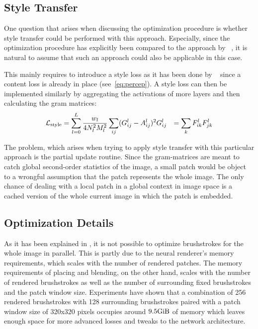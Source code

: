 \subsection{Style Transfer}

One question that arises when discussing the optimization procedure is whether style transfer could be performed with this approach.
Especially, since the optimization procedure has explicitly been compared to the approach by \citeauthor*{gatys}~\cite{gatys}, it is natural to assume that such an approach could also be applicable in this case.

This mainly requires to introduce a style loss as it has been done by \citeauthor*{gatys}~\cite{gatys} since a content loss is already in place (see~\eqref{eq:percep}).
A style loss can then be implemented similarly by aggregating the activations of more layers and then calculating the gram matrices:
\begin{align}
    \mathcal{L}_{\text{style}} & = \sum_{l=0}^L \frac{w_l}{4 N^2_l M^2_l} \sum_{ij} (G_{ij}^l - A_{ij}^l)^2
    G_{ij}^l & = \sum_k F_{ik}^l F_{jk}^l
\end{align}

The problem, which arises when trying to apply style transfer with this particular approach is the partial update routine.
Since the gram-matrices are meant to catch global second-order statistics of the image, a small patch would be object to a wrongful assumption that the patch represents the whole image.
The only chance of dealing with a local patch in a global context in image space is a cached version of the whole current image in which the patch is embedded.

\subsection{Optimization Details}

As it has been explained in , it is not possible to optimize brushstrokes for the whole image in parallel.
This is partly due to the neural renderer's memory requirements, which scales with the number of rendered patches.
The memory requirements of placing and blending, on the other hand, scales with the number of rendered brushstrokes as well as the number of surrounding fixed brushstrokes and the patch window size.
Experiments have shown that a combination of 256 rendered brushstrokes with 128 surrounding brushstrokes paired with a patch window size of 320x320 pixels occupies around $9.5 \si{\gibi \byte}$ of memory which leaves enough space for more advanced losses and tweaks to the network architecture.

